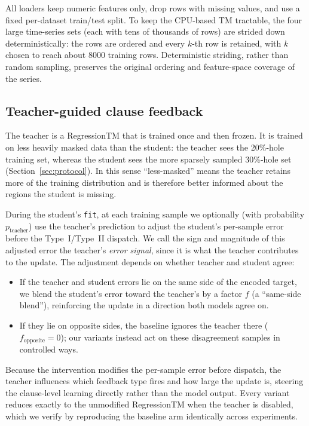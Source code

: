 All loaders keep numeric features only, drop rows with missing values, and use a fixed
per-dataset train/test split. To keep the CPU-based TM tractable, the four large
time-series sets (each with tens of thousands of rows) are strided down deterministically:
the rows are ordered and every $k$-th row is retained, with $k$ chosen to reach about
$8000$ training rows. Deterministic striding, rather than random sampling, preserves the
original ordering and feature-space coverage of the series.

\subsection{Teacher-guided clause feedback}
\label{sec:tgcf}

The teacher is a RegressionTM that is trained once and then frozen. It is trained on less
heavily masked data than the student: the teacher sees the 20\%-hole training set, whereas
the student sees the more sparsely sampled 30\%-hole set (Section~\ref{sec:protocol}). In
this sense ``less-masked'' means the teacher retains more of the training distribution and
is therefore better informed about the regions the student is missing.

During the student's \texttt{fit}, at each training sample we optionally (with probability
$p_{\text{teacher}}$) use the teacher's prediction to adjust the student's per-sample error
before the Type~I/Type~II dispatch. We call the sign and magnitude of this adjusted error
the teacher's \textit{error signal}, since it is what the teacher contributes to the update.
The adjustment depends on whether teacher and student agree:

\begin{itemize}
  \item If the teacher and student errors lie on the same side of the encoded target, we
    blend the student's error toward the teacher's by a factor $f$ (a ``same-side
    blend''), reinforcing the update in a direction both models agree on.
  \item If they lie on opposite sides, the baseline ignores the teacher there
    ($f_{\text{opposite}}=0$); our variants instead act on these disagreement samples in
    controlled ways.
\end{itemize}

Because the intervention modifies the per-sample error before dispatch, the teacher
influences which feedback type fires and how large the update is, steering the clause-level
learning directly rather than the model output. Every variant reduces exactly to the
unmodified RegressionTM when the teacher is disabled, which we verify by reproducing the
baseline arm identically across experiments.

